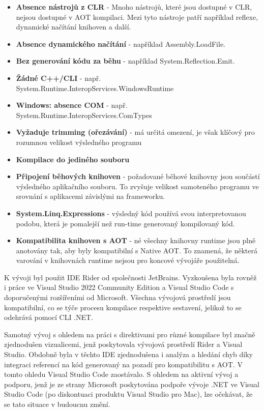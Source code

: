 \begin{itemize}
    \item  \textbf{Absence nástrojů z CLR} - Mnoho nástrojů, které jsou dostupné v CLR, nejsou dostupné v AOT kompilaci. Mezi tyto nástroje patří například reflexe, dynamické načítání knihoven a další.
    \item \textbf{Absence dynamického načítání} - například Assembly.LoadFile.
    \item \textbf{Bez generování kódu za běhu} - například System.Reflection.Emit.
    \item \textbf{Žádné C++/CLI} - např. System.Runtime.InteropServices.WindowsRuntime
    \item \textbf{Windows: absence COM} - např. System.Runtime.InteropServices.ComTypes
    \item \textbf{Vyžaduje trimming (ořezávání)} - má určitá omezení, je však klíčový pro rozumnou velikost výsledného programu
    \item \textbf{Kompilace do jediného souboru} 
    \item \textbf{Připojení běhových knihoven} - požadované běhové knihovny jsou součástí výsledného aplikačního souboru. To zvyšuje velikost samoteného programu ve srovnání s aplikacemi závislými na frameworku.
    \item \textbf{System.Linq.Expressions} - výsledný kód používá svou interpretovanou podobu, která je pomalejší než run-time generovaný kompilovaný kód.
    \item \textbf{Kompatibilita knihoven s AOT} - né všechny knihovny runtime jsou plně anotovány tak, aby byly kompatibilní s Native AOT. To znamená, že některá varování v knihovnách runtime nejsou pro koncové vývojáře použitelná.
\end{itemize}



K vývoji byl použit IDE Rider od společnosti JetBrains. Vyzkoušena byla rovněž i práce ve Visual Studio 2022 Community Edition a Visual Studio Code s doporučenými rozšířeními od Microsoft. Všechna vývojová prostředí jsou kompatibilní, co se týče procesu kompilace respektive sestavení, jelikož to se odehrává pomocí CLI .NET.

Samotný vývoj s ohledem na práci s direktivami pro různé kompilace byl značně zjednodušen vizualicemi, jenž poskytovala vývojová prostředí Rider a Visual Studio. Obdobně byla v těchto IDE zjednodušena i analýza a hledání chyb díky integraci referencí na kód generovaný na pozadí pro kompatibilitu s AOT. V tomto ohledu Visual Studio Code zaostávalo. S ohledem na aktivní vývoj a podporu, jenž je ze strany Microsoft poskytována podpoře vývoje .NET ve Visual Studio Code (po diskontuaci produktu Visual Studio pro Mac), lze očekávat, že se tato situace v budoucnu změní.

